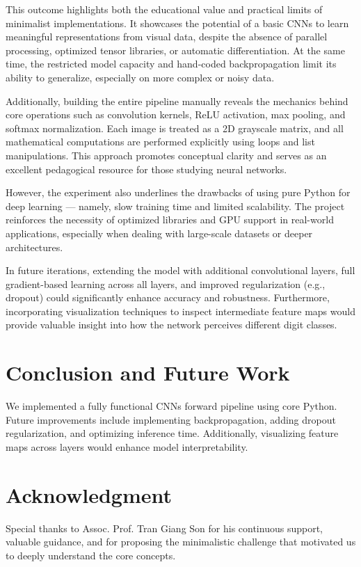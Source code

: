 \documentclass[conference]{IEEEtran}
\begin{document}
This outcome highlights both the educational value and practical limits of minimalist implementations. It showcases the potential of a basic CNNs to learn meaningful representations from visual data, despite the absence of parallel processing, optimized tensor libraries, or automatic differentiation. At the same time, the restricted model capacity and hand-coded backpropagation limit its ability to generalize, especially on more complex or noisy data.

Additionally, building the entire pipeline manually reveals the mechanics behind core operations such as convolution kernels, ReLU activation, max pooling, and softmax normalization. Each image is treated as a 2D grayscale matrix, and all mathematical computations are performed explicitly using loops and list manipulations. This approach promotes conceptual clarity and serves as an excellent pedagogical resource for those studying neural networks.

However, the experiment also underlines the drawbacks of using pure Python for deep learning — namely, slow training time and limited scalability. The project reinforces the necessity of optimized libraries and GPU support in real-world applications, especially when dealing with large-scale datasets or deeper architectures.

In future iterations, extending the model with additional convolutional layers, full gradient-based learning across all layers, and improved regularization (e.g., dropout) could significantly enhance accuracy and robustness. Furthermore, incorporating visualization techniques to inspect intermediate feature maps would provide valuable insight into how the network perceives different digit classes.


\section{Conclusion and Future Work}
We implemented a fully functional CNNs forward pipeline using core Python. Future improvements include implementing backpropagation, adding dropout regularization, and optimizing inference time. Additionally, visualizing feature maps across layers would enhance model interpretability.

\section*{Acknowledgment}
Special thanks to Assoc. Prof. Tran Giang Son for his continuous support, valuable guidance, and for proposing the minimalistic challenge that motivated us to deeply understand the core concepts.
\end{document}
